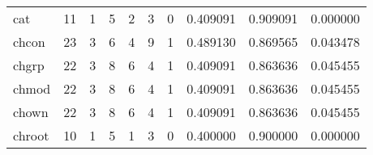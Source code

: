 \begin{longtable}{lrrrrrrrrr}
cat       &                                       11 &                                                  1 &                                                  5 &                                                  2 &                                                  3 &                                                  0 &                                           0.409091 &                               0.909091 &                             0.000000 \\
chcon     &                                       23 &                                                  3 &                                                  6 &                                                  4 &                                                  9 &                                                  1 &                                           0.489130 &                               0.869565 &                             0.043478 \\
chgrp     &                                       22 &                                                  3 &                                                  8 &                                                  6 &                                                  4 &                                                  1 &                                           0.409091 &                               0.863636 &                             0.045455 \\
chmod     &                                       22 &                                                  3 &                                                  8 &                                                  6 &                                                  4 &                                                  1 &                                           0.409091 &                               0.863636 &                             0.045455 \\
chown     &                                       22 &                                                  3 &                                                  8 &                                                  6 &                                                  4 &                                                  1 &                                           0.409091 &                               0.863636 &                             0.045455 \\
chroot    &                                       10 &                                                  1 &                                                  5 &                                                  1 &                                                  3 &                                                  0 &                                           0.400000 &                               0.900000 &                             0.000000 \\

\end{longtable}
